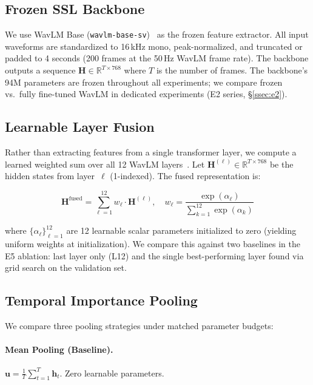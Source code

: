 \documentclass[11pt,a4paper]{article}
\begin{document}
\subsection{Frozen SSL Backbone}
\label{ssec:backbone}

We use WavLM Base (\texttt{wavlm-base-sv})~\cite{chen2022wavlm} as the frozen
feature extractor. All input waveforms are standardized to 16\,kHz mono,
peak-normalized, and truncated or padded to 4 seconds (200 frames at the 50\,Hz
WavLM frame rate). The backbone outputs a sequence $\mathbf{H} \in
\mathbb{R}^{T \times 768}$ where $T$ is the number of frames. The backbone's
94M parameters are frozen throughout all experiments; we compare frozen
vs.\ fully fine-tuned WavLM in dedicated experiments (E2 series,
\S\ref{ssec:e2}).

\subsection{Learnable Layer Fusion}
\label{ssec:layer_fusion}

Rather than extracting features from a single transformer layer, we compute a
learned weighted sum over all 12 WavLM layers~\cite{rozen2024layer}. Let
$\mathbf{H}^{(\ell)} \in \mathbb{R}^{T \times 768}$ be the hidden states from
layer~$\ell$ (1-indexed). The fused representation is:

\begin{equation}
\mathbf{H}^{\text{fused}} = \sum_{\ell=1}^{12} w_\ell \cdot \mathbf{H}^{(\ell)},
\quad w_\ell = \frac{\exp(\alpha_\ell)}{\sum_{k=1}^{12} \exp(\alpha_k)}
\end{equation}

where $\{\alpha_\ell\}_{\ell=1}^{12}$ are 12 learnable scalar parameters
initialized to zero (yielding uniform weights at initialization). We compare
this against two baselines in the E5 ablation: last layer only (L12) and the
single best-performing layer found via grid search on the validation set.

\subsection{Temporal Importance Pooling}
\label{ssec:pooling}

We compare three pooling strategies under matched parameter budgets:

\paragraph{Mean Pooling (Baseline).}
$\mathbf{u} = \frac{1}{T}\sum_{t=1}^{T} \mathbf{h}_t$. Zero learnable
parameters.
\end{document}
